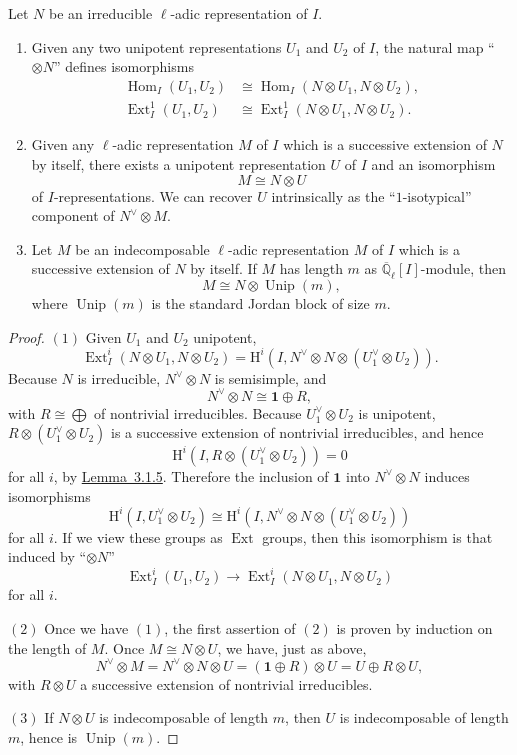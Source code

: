 Let \(N\) be an irreducible \(\ell\)-adic representation of \(I\).
\begin{enumerate}[label=(\arabic*)]
\item Given any two unipotent representations \(U_1\) and \(U_2\) of \(I\),
the natural map ``\(\otimes N\)'' defines isomorphisms
\[
\begin{aligned}
  \operatorname{Hom}_I(U_1,U_2)
  &\cong
  \operatorname{Hom}_I(N\otimes U_1,N\otimes U_2),\\
  \operatorname{Ext}^1_I(U_1,U_2)
  &\cong
  \operatorname{Ext}^1_I(N\otimes U_1,N\otimes U_2).
\end{aligned}
\]
\item Given any \(\ell\)-adic representation \(M\) of \(I\) which is a
successive extension of \(N\) by itself, there exists a unipotent
representation \(U\) of \(I\) and an isomorphism
\[
  M\cong N\otimes U
\]
of \(I\)-representations. We can recover \(U\) intrinsically as the
``\(1\)-isotypical'' component of \(N^{\vee}\otimes M\).
\item Let \(M\) be an indecomposable \(\ell\)-adic representation \(M\) of
\(I\) which is a successive extension of \(N\) by itself. If \(M\) has length
\(m\) as \(\overline{\mathbb{Q}}_\ell[I]\)-module, then
\[
  M\cong N\otimes\operatorname{Unip}(m),
\]
where \(\operatorname{Unip}(m)\) is the standard Jordan block of size \(m\).
\end{enumerate}

\begin{proof}
\((1)\) Given \(U_1\) and \(U_2\) unipotent,
\[
  \operatorname{Ext}^i_I(N\otimes U_1,N\otimes U_2)
  =
  \mathrm{H}^i(I,N^{\vee}\otimes N\otimes(U_1^{\vee}\otimes U_2)).
\]
Because \(N\) is irreducible, \(N^{\vee}\otimes N\) is semisimple, and
\[
  N^{\vee}\otimes N\cong \mathbf{1}\oplus R,
\]
with \(R\cong\bigoplus\) of nontrivial irreducibles. Because
\(U_1^{\vee}\otimes U_2\) is unipotent,
\(R\otimes(U_1^{\vee}\otimes U_2)\) is a successive extension of nontrivial
irreducibles, and hence
\[
  \mathrm{H}^i(I,R\otimes(U_1^{\vee}\otimes U_2))=0
\]
for all \(i\), by \hyperref[lem:3.1.5]{Lemma~3.1.5}. Therefore the inclusion
of \(\mathbf{1}\) into \(N^{\vee}\otimes N\) induces isomorphisms
\[
  \mathrm{H}^i(I,U_1^{\vee}\otimes U_2)
  \cong
  \mathrm{H}^i(I,N^{\vee}\otimes N\otimes(U_1^{\vee}\otimes U_2))
\]
for all \(i\). If we view these groups as \(\operatorname{Ext}\) groups, then
this isomorphism is that induced by ``\(\otimes N\)''
\[
  \operatorname{Ext}^i_I(U_1,U_2)
  \longrightarrow
  \operatorname{Ext}^i_I(N\otimes U_1,N\otimes U_2)
\]
for all \(i\).

\((2)\) Once we have \((1)\), the first assertion of \((2)\) is proven by
induction on the length of \(M\). Once \(M\cong N\otimes U\), we have, just as
above,
\[
  N^{\vee}\otimes M
  =
  N^{\vee}\otimes N\otimes U
  =
  (\mathbf{1}\oplus R)\otimes U
  =
  U\oplus R\otimes U,
\]
with \(R\otimes U\) a successive extension of nontrivial irreducibles.

\((3)\) If \(N\otimes U\) is indecomposable of length \(m\), then \(U\) is
indecomposable of length \(m\), hence is \(\operatorname{Unip}(m)\).
\end{proof}

